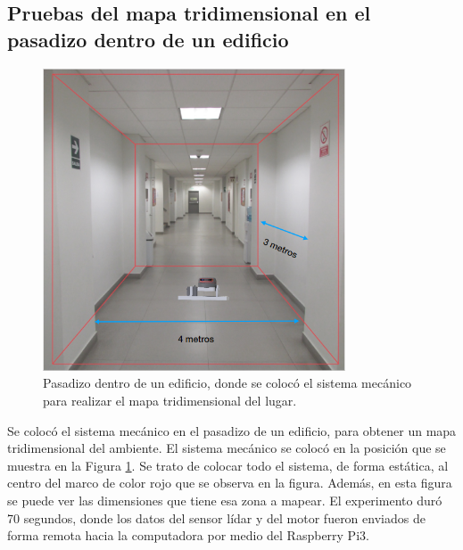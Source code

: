 \subsection{Pruebas del mapa tridimensional en el pasadizo dentro de un edificio}
\begin{figure}
  \centering \footnotesize
  \includegraphics[width=0.80\textwidth]{images/esan_lidar.PNG}
  \captionsetup{font=footnotesize}
  \caption{Pasadizo dentro de un edificio, donde se colocó el sistema mecánico para 
  realizar el mapa tridimensional del lugar.}
  \label{fig:pasadizoEsan}
\end{figure}

Se colocó el sistema mecánico en el pasadizo de un edificio, para obtener un mapa
tridimensional del ambiente. El sistema mecánico se colocó en la posición que se
muestra en la Figura \ref{fig:pasadizoEsan}. Se trato de colocar todo el sistema, de
forma estática, al centro del marco de color rojo que se observa en la figura. Además, 
en esta figura se puede ver las dimensiones que tiene esa zona a mapear. El experimento
duró 70 segundos, donde los datos del sensor lídar y del motor fueron enviados de forma
remota hacia la computadora por medio del Raspberry Pi3.



